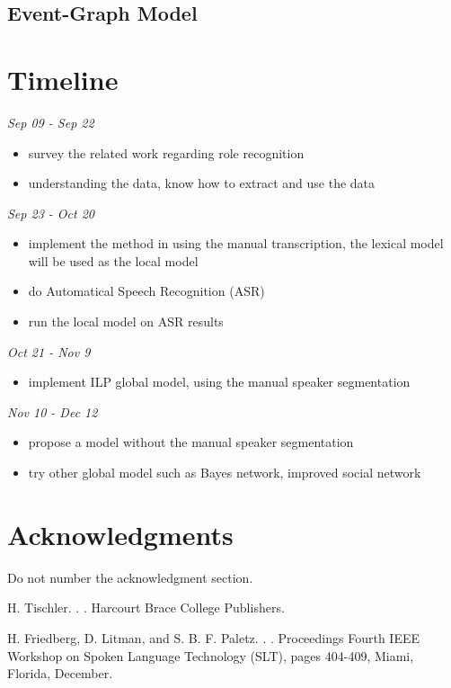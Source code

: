 \documentclass[11pt,letterpaper]{article}
\begin{document}
\subsection{Event-Graph Model}

\section{Timeline}

\noindent \emph{Sep 09 - Sep 22}
\begin{itemize}
  \item survey the related work regarding role recognition
  \item understanding the data, know how to extract and use the data
\end{itemize}

\noindent \emph{Sep 23 -  Oct 20}
\begin{itemize}
  \item implement the method in \cite{Garg:2008} using the manual transcription, the lexical model will be used as the local model
  \item do Automatical Speech Recognition (ASR)
  \item run the local model on ASR results
\end{itemize}

\noindent \emph{Oct 21 - Nov 9}
\begin{itemize}
  \item implement ILP global model, using the manual speaker segmentation
\end{itemize}

\noindent \emph{Nov 10 - Dec 12}
\begin{itemize}
  \item propose a model without the manual speaker segmentation
  \item try other global model such as Bayes network, improved social network
\end{itemize}

\section*{Acknowledgments}

Do not number the acknowledgment section.

\begin{thebibliography}{}

H. Tischler.
. 
. 
\newblock Harcourt Brace College Publishers.

H. Friedberg, D. Litman, and S. B. F. Paletz.
. 
. 
\newblock Proceedings Fourth IEEE Workshop on Spoken Language Technology (SLT), pages 404-409, Miami, Florida, December.

\end{thebibliography}
\end{document}
